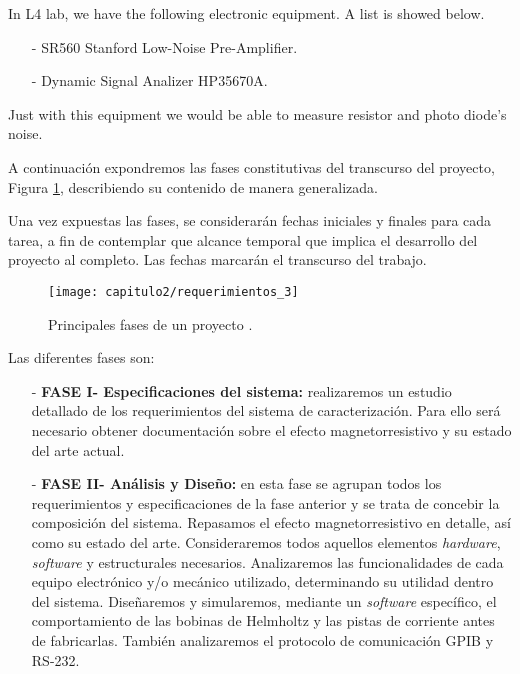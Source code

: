 \begin{itemize}
In L4 lab, we have the following electronic equipment. A list is showed below.

\begin{itemize}
  \item [-] SR560 Stanford Low-Noise Pre-Amplifier. 
	\item [-] Dynamic Signal Analizer HP35670A.
\end{itemize}

Just with this equipment we would be able to measure resistor and photo diode's noise.

A continuación expondremos las fases constitutivas del transcurso del proyecto, Figura \ref{fig:fases_proy_imagen}, describiendo su contenido de manera generalizada.

Una vez expuestas las fases, se considerarán fechas iniciales y finales para cada tarea, a fin de contemplar que alcance temporal que implica el desarrollo del proyecto al completo. Las fechas marcarán el transcurso del trabajo.

\smallskip	
\begin{figure}[H]%
\noindent \begin{centering}
\texttt{[image: capitulo2/requerimientos\_3]}
\par\end{centering}
\smallskip
\caption{\label{fig:fases_proy_imagen} Principales fases de un proyecto \cite{WIKIPED}.}
\end{figure}

\newpage
Las diferentes fases son:

\begin{enumerate}
 \item[-] \textbf{FASE I- Especificaciones del sistema:} realizaremos un estudio detallado de los requerimientos del sistema de caracterización. Para ello será necesario obtener documentación sobre el efecto magnetorresistivo y su estado del arte actual.

 \item[-] \textbf{FASE II- Análisis y Diseño:} en esta fase se agrupan todos los requerimientos y especificaciones de la fase anterior y se trata de concebir la composición del sistema. Repasamos el efecto magnetorresistivo en detalle, así como su estado del arte. Consideraremos todos aquellos elementos \textit{hardware}, \textit{software} y estructurales necesarios. Analizaremos las funcionalidades de cada equipo electrónico y/o mecánico utilizado, determinando su utilidad dentro del sistema. Diseñaremos y simularemos, mediante un \textit{software} específico, el comportamiento de las bobinas de Helmholtz y las pistas de corriente antes de fabricarlas. También analizaremos el protocolo de comunicación GPIB y RS-232.


\end{enumerate}
\end{itemize}
